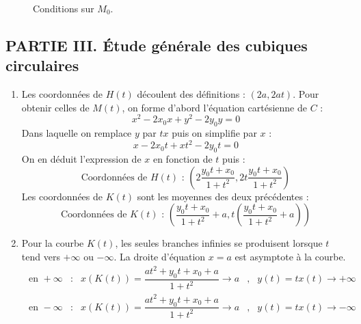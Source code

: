 \begin{figure}[ht]
 \centering
 
 \caption{Conditions sur $M_0$.}
 \label{fig:Ccubcirc_3} 
\end{figure}
\subsection*{PARTIE III. \'Etude g{\'e}n{\'e}rale des cubiques
circulaires}
\begin{enumerate}
 \item Les coordonnées de $H(t)$ découlent des définitions : $(2a,2at)$.\newline
Pour obtenir celles de $M(t)$, on forme d'abord l'équation cartésienne de $C$ :
\begin{displaymath}
 x^2 - 2x_0x + y^2 -2y_0y =0
\end{displaymath}
Dans  laquelle on remplace $y$ par $tx$ puis on simplifie par $x$ :
\begin{displaymath}
 x-2x_0t+xt^2-2y_0t=0
\end{displaymath}
On en déduit l'expression de $x$ en fonction de $t$ puis :
\begin{displaymath}
 \text{Coordonnées de $H(t)$ : } (2\dfrac{y_0t+x_0}{1+t^2},2t\dfrac{y_0t+x_0}{1+t^2})
\end{displaymath}
Les coordonnées de $K(t)$ sont les moyennes des deux précédentes :
\begin{displaymath}
 \text{Coordonnées de $K(t)$ : } (\dfrac{y_0t+x_0}{1+t^2}+a,t\left( \dfrac{y_0t+x_0}{1+t^2}+a\right) )
\end{displaymath}

\item Pour la courbe $K(t)$, les seules branches infinies se produisent lorsque $t$ tend vers $+\infty$ ou $-\infty$. La droite d'équation $x=a$ est asymptote à la courbe.
\begin{align*}
 \text{ en } +\infty &:& x(K(t)) = \dfrac{at^2+y_0t+x_0+a}{1+t^2}\rightarrow a &,& y(t)=tx(t)\rightarrow +\infty \\
 \text{ en } -\infty &:& x(K(t)) = \dfrac{at^2+y_0t+x_0+a}{1+t^2}\rightarrow a &,& y(t)=tx(t)\rightarrow -\infty 
\end{align*}


\end{enumerate}

